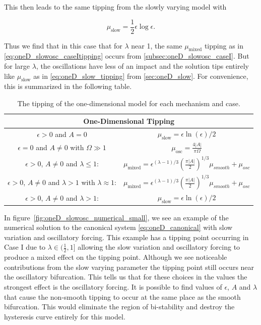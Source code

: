 This then leads to the same tipping from the slowly varying model with 

\begin{equation*}
\mu_{\text{slow}}=\frac{1}{2}\epsilon\log\epsilon.
\end{equation*}

Thus we find that in this case that for $\lambda$ near 1, the same $\mu_{\text{mixed}}$ tipping as in \eqref{eq:oneD_slowosc_caseItipping} occurs from \autoref{subsec:oneD_slowosc_caseI}. But for large $\lambda$, the oscillations have less of an impact and the solution tips entirely like $\mu_{\text{slow}}$ as in \eqref{eq:oneD_slow_tipping} from \autoref{sec:oneD_slow}. For convenience, this is summarized in the following table.

\begin{center}
\begin{table}[H]\label{table:oneD_tipping}
\centering
\begin{tabular}{|c|c|}
\hline 
 \multicolumn{2}{|c|}{One-Dimensional Tipping} \\ 
\hline
$\epsilon>0$ and $A=0$ & $\mu_{\text{slow}}=\epsilon\ln(\epsilon)/2$ \\ 
\hline 
$\epsilon=0$ and $A\not=0$ with $\Omega\gg1$ & $\mu_{\text{osc}}=\frac{4|A|}{\pi \Omega}$\\ 
\hline 
$\epsilon>0$, $A\not=0$ and $\lambda\le 1$: & $\mu_{\text{mixed}}=\epsilon^{(\lambda-1)/3}\left(\frac{\pi |A|}{2}\right)^{1/3} \mu_{smooth}+\mu_{osc}$ \\ 
\hline 
$\epsilon>0$, $A\not=0$ and $\lambda> 1$ with $\lambda\approx 1$: & $\mu_{\text{mixed}}=\epsilon^{(\lambda-1)/3}\left(\frac{\pi |A|}{2}\right)^{1/3} \mu_{smooth}+\mu_{osc}$ \\
\hline
$\epsilon>0$, $A\not=0$ and $\lambda>1$: & $ \mu_{\text{slow}}=\epsilon\ln(\epsilon)/2$\\
\hline
\end{tabular} 
\caption{The tipping of the one-dimensional model for each mechanism and case.}
\end{table}
\end{center}

In figure~\ref{fig:oneD_slowosc_numerical_small}, we see an example of the numerical solution to the canonical system \eqref{eq:oneD_canonical} with slow variation and oscillatory forcing. This example has a tipping point occurring in Case I due to $\lambda\in (\frac{1}{2},1]$ allowing the slow variation and oscillatory forcing to produce a mixed effect on the tipping point. Although we see noticeable contributions from the slow varying parameter the tipping point still occurs near the oscillatory bifurcation. This tells us that for these choices in the values the strongest effect is the oscillatory forcing. It is possible to find values of $\epsilon$, $A$ and $\lambda$ that cause the non-smooth tipping to occur at the same place as the smooth bifurcation. This would eliminate the region of bi-stability and destroy the hysteresis curve entirely for this model.

